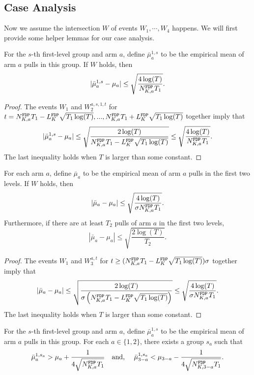 \subsection{Case Analysis}
Now we assume the intersection $W$ of events $W_1,\cdots,W_4$ happens. We will
first provide some helper lemmas for our case analysis.

\begin{lemma}
  For the $s$-th first-level group and arm $a$, define
  $\bar{\mu}_a^{1,s}$ to be the empirical mean of arm $a$ pulls in
  this group. If $W$ holds, then
  \[
    |\bar{\mu}_a^{1,s} - \mu_a| \leq \sqrt{\frac{4\log(T)}{\fdpN T_1}}.
  \]
\end{lemma}

\begin{proof}
  The events $W_1$ and $W_2^{a,s,1,t}$ for
  $t = \fdpN T_1- \GdT \sqrt{T_1\log(T)},...,\fdpN T_1 + \GdT
  \sqrt{T_1\log(T)}$ together imply that
\[
|\bar{\mu}_a^{1,s} - \mu_a| \leq \sqrt{\frac{2\log(T)}{\fdpN T_1- \GdT \sqrt{T_1\log(T)}}} \leq \sqrt{\frac{4\log(T)}{\fdpN T_1}}.
\]
The last inequality holds when $T$ is larger than some constant.
\end{proof}


\begin{lemma}
  For each arm $a$, define $\bar{\mu}_a$ to be the empirical mean of
  arm $a$ pulls in the first two levels. If $W$ holds, then
  \[
    |\bar{\mu}_a - \mu_a| \leq \sqrt{\frac{4\log(T)}{\NG \fdpN T_1}} .
  \]
Furthermore, if there are at least $T_2$ pulls of arm $a$ in the first two levels,
\[
|\bar{\mu}_a-\mu_a| \leq \sqrt{\frac{2\log(T)}{T_2}}.
\]
\end{lemma}

\begin{proof}
The events $W_1$ and $W_3^{a,t}$ for $t \geq  (\fdpN T_1- \GdT \sqrt{T_1\log(T)})\NG$ together imply that
  \[
    |\bar{\mu}_a - \mu_a| \leq \sqrt{\frac{2\log(T)}{\NG\left(\fdpN T_1- \GdT \sqrt{T_1\log(T)}\right)}} \leq \sqrt{\frac{4\log(T)}{\NG \fdpN T_1}} .
\]
The last inequality holds when $T$ is larger than some constant.
\end{proof}


\begin{lemma}\label{lem:luck}
  For the $s$-th first-level group and arm $a$, define
  $\bar{\mu}_a^{1,s}$ to be the empirical mean of arm $a$ pulls in
  this group. For each $a \in \{1,2\}$, there exists a group $s_a$
  such that
\[
\bar{\mu}_a ^{1,s_a} > \mu_a + \frac{1}{4\sqrt{\fdpN T_1}} \quad \mbox{and, } \quad
\bar{\mu}_{3-a} ^{1,s_a} < \mu_{3-a}   - \frac{1}{4\sqrt{\fdpN[3-a] T_1}}.
\]
\end{lemma}





